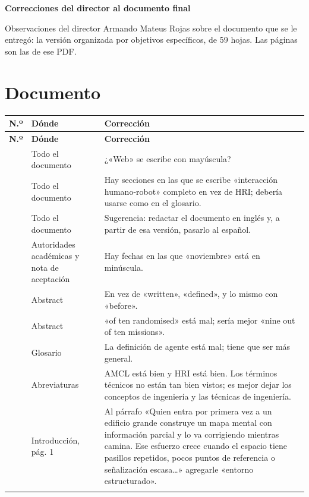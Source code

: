\documentclass[11pt]{article}
\begin{document}
{\Large\textbf{Correcciones del director al documento final}}

Observaciones del director Armando Mateus Rojas sobre el documento que se le entregó: la
versión organizada por objetivos específicos, de 59 hojas. Las páginas son las de ese PDF.

\section*{Documento}

{\small
\begin{longtable}{@{}L{0.04\textwidth}L{0.24\textwidth}L{0.66\textwidth}@{}}
\toprule
\textbf{N.º} & \textbf{Dónde} & \textbf{Corrección} \\ \midrule
\endfirsthead
\toprule
\textbf{N.º} & \textbf{Dónde} & \textbf{Corrección} \\ \midrule
\endhead
\bottomrule
{} & Todo el documento & ¿«Web» se escribe con mayúscula? \\  & Todo el documento & Hay secciones en las que se escribe «interacción humano-robot» completo en vez de HRI; debería usarse como en el glosario. \\  & Todo el documento & Sugerencia: redactar el documento en inglés y, a partir de esa versión, pasarlo al español. \\  & Autoridades académicas y nota de aceptación & Hay fechas en las que «noviembre» está en minúscula. \\  & Abstract & En vez de «written», «defined», y lo mismo con «before». \\  & Abstract & «of ten randomised» está mal; sería mejor «nine out of ten missions». \\  & Glosario & La definición de agente está mal; tiene que ser más general. \\  & Abreviaturas & AMCL está bien y HRI está bien. Los términos técnicos no están tan bien vistos; es mejor dejar los conceptos de ingeniería y las técnicas de ingeniería. \\  & Introducción, pág. 1 & Al párrafo «Quien entra por primera vez a un edificio grande construye un mapa mental con información parcial y lo va corrigiendo mientras camina. Ese esfuerzo crece cuando el espacio tiene pasillos repetidos, pocos puntos de referencia o señalización escasa…» agregarle «entorno estructurado». \\ \addlinespace

\end{longtable}}
\end{document}
